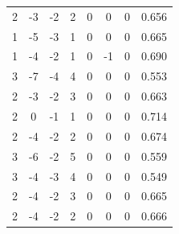 \documentclass[a4paper, 12pt]{article}
\begin{document}
\begin{table}[H]
\begin{tabular}{@{}cccccccc@{}}
    2                      & -3                     & -2                     & 2                      & 0                 & 0                 & 0                 & 0.656               \\
    1                      & -5                     & -3                     & 1                      & 0                 & 0                 & 0                 & 0.665               \\
    1                      & -4                     & -2                     & 1                      & 0                 & -1                & 0                 & 0.690               \\
    3                      & -7                     & -4                     & 4                      & 0                 & 0                 & 0                 & 0.553               \\
    2                      & -3                     & -2                     & 3                      & 0                 & 0                 & 0                 & 0.663               \\
    2                      & 0                      & -1                     & 1                      & 0                 & 0                 & 0                 & 0.714               \\
    2                      & -4                     & -2                     & 2                      & 0                 & 0                 & 0                 & 0.674               \\
    3                      & -6                     & -2                     & 5                      & 0                 & 0                 & 0                 & 0.559               \\
    3                      & -4                     & -3                     & 4                      & 0                 & 0                 & 0                 & 0.549               \\
    2                      & -4                     & -2                     & 3                      & 0                 & 0                 & 0                 & 0.665               \\
    2                      & -4                     & -2                     & 2                      & 0                 & 0                 & 0                 & 0.666               \\ \bottomrule
    \end{tabular}
    \end{table}
\end{document}
